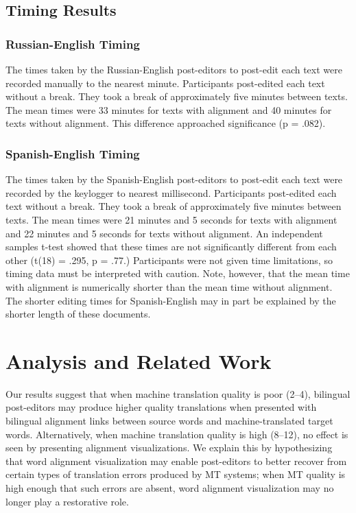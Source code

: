 



\subsection{Timing Results}

\subsubsection{Russian-English Timing}

The times taken by the Russian-English post-editors to post-edit each text were recorded manually to the nearest minute.
%
Participants post-edited each text without a break.
%
They took a break of approximately five minutes between texts.
%
The mean times were 33 minutes for texts with alignment and 40 minutes for texts without alignment.
%
This difference approached significance (p = .082).

\subsubsection{Spanish-English Timing}

The times taken by the Spanish-English post-editors to post-edit each text were recorded by the keylogger to nearest millisecond.
%
Participants post-edited each text without a break.
%
They took a break of approximately five minutes between texts.
%
The mean times were 21 minutes  and 5 seconds for texts with alignment and 22 minutes and 5 seconds for texts without alignment.
%
An independent samples t-test showed that these times are not significantly different from each other (t(18) = .295, p = .77.) 
%
Participants were not given time limitations, so timing data must be interpreted with caution. Note, however, that the mean time with alignment is numerically shorter than the mean time without alignment.
%
The shorter editing times for Spanish-English may in part be explained by the shorter length of these documents.


\section{Analysis and Related Work}
\label{sec:background}

Our results suggest that when machine translation quality is poor (2--4), bilingual post-editors may produce higher quality translations when presented with bilingual alignment links between source words and machine-translated target words.
%
Alternatively, when machine translation quality is high (8--12), no effect is seen by presenting alignment visualizations.
%
We explain this by hypothesizing that word alignment visualization may enable post-editors to better recover from certain types of translation errors produced by MT systems; when MT quality is high enough that such errors are absent, word alignment visualization may no longer play a restorative role.


